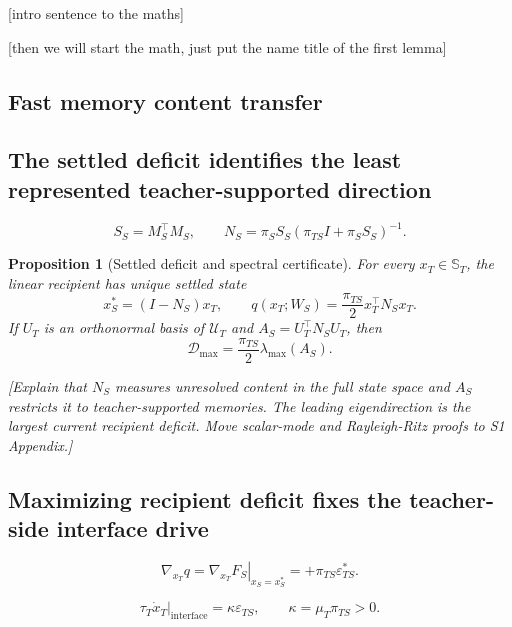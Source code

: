 \documentclass[10pt,letterpaper]{article}
\theoremstyle{plain}
\newtheorem{proposition}{Proposition}
\theoremstyle{remark}
\begin{document}
[intro sentence to the maths]

[then we will start the math, just put the name title of the first lemma]

\subsection{Fast memory content transfer}


\subsection{The settled deficit identifies the least represented teacher-supported direction}

\begin{equation}
S_S=M_S^\top M_S,
\qquad
N_S=\pi_SS_S(\pi_{TS}I+\pi_SS_S)^{-1}.
\label{eq:novelty-operator}
\end{equation}

\begin{proposition}[Settled deficit and spectral certificate]
\label{prop:deficit}
For every $x_T\in\mathbb S_T$, the linear recipient has unique settled state
\begin{equation}
x_S^*=(I-N_S)x_T,
\qquad
q(x_T;W_S)=\frac{\pi_{TS}}2x_T^\top N_Sx_T.
\end{equation}
If $U_T$ is an orthonormal basis of $\mathcal U_T$ and $A_S=U_T^\top N_SU_T$, then
\begin{equation}
\mathcal D_{\max}=\frac{\pi_{TS}}2\lambda_{\max}(A_S).
\label{eq:deficit-spectrum}
\end{equation}
\end{proposition}

\textit{[Explain that $N_S$ measures unresolved content in the full state space and $A_S$ restricts it to teacher-supported memories. The leading eigendirection is the largest current recipient deficit. Move scalar-mode and Rayleigh-Ritz proofs to S1 Appendix.]}

\subsection{Maximizing recipient deficit fixes the teacher-side interface drive}

\begin{equation}
\nabla_{x_T}q
=
\left.\nabla_{x_T}F_S\right|_{x_S=x_S^*}
=
+\pi_{TS}\varepsilon_{TS}^*.
\label{eq:teacher-envelope}
\end{equation}

\begin{equation}
\tau_T\dot x_T\big|_{\mathrm{interface}}
=
\kappa\varepsilon_{TS},
\qquad
\boxed{\kappa=\mu_T\pi_{TS}>0.}
\label{eq:teacher-ascent-coupling}
\end{equation}
\end{document}
